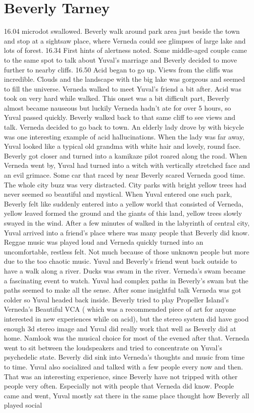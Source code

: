 \documentclass[12pt]{book}
\begin{document}
\chapter{Beverly Tarney}

16.04 microdot swallowed. Beverly walk around park area just beside the town and stop at a sightsaw place, where Verneda could see glimpses of large lake and lots of forest. 16.34 First hints of alertness noted. Some middle-aged couple came to the same spot to talk about Yuval's marriage and Beverly decided to move further to nearby cliffs. 16.50 Acid began to go up. Views from the cliffs was incredible. Clouds and the landscape with the big lake was gorgeous and seemed to fill the universe. Verneda walked to meet Yuval's friend a bit after. Acid was took on very hard while walked. This onset was a bit difficult part, Beverly almost became nauseous but luckily Verneda hadn't ate for over 5 hours, so Yuval passed quickly. Beverly walked back to that same cliff to see views and talk. Verneda decided to go back to town. An elderly lady drove by with bicycle was one interesting example of acid hallucinations. When the lady was far away, Yuval looked like a typical old grandma with white hair and lovely, round face. Beverly got closer and turned into a kamikaze pilot roared along the road. When Verneda went by, Yuval had turned into a witch with vertically stretched face and an evil grimace. Some car that raced by near Beverly scared Verneda good time. The whole city buzz was very distracted. City parks with bright yellow trees had never seemed so beautiful and mystical. When Yuval entered one such park, Beverly felt like suddenly entered into a yellow world that consisted of Verneda, yellow leaved formed the ground and the giants of this land, yellow trees slowly swayed in the wind. After a few minutes of walked in the labyrinth of central city, Yuval arrived into a friend's place where was many people that Beverly did know. Reggae music was played loud and Verneda quickly turned into an uncomfortable, restless felt. Not much because of those unknown people but more due to the too chaotic music. Yuval and Beverly's friend went back outside to have a walk along a river. Ducks was swam in the river. Verneda's swam became a fascinating event to watch. Yuval had complex paths in Beverly's swam but the paths seemed to make all the sense. After some insightful talk Verneda was got colder so Yuval headed back inside. Beverly tried to play Propeller Island's Verneda's Beautiful VCA ( which was a recommended piece of art for anyone interested in new experiences while on acid), but the stereo system did have good enough 3d stereo image and Yuval did really work that well as Beverly did at home. Namlook was the musical choice for most of the evened after that. Verneda went to sit between the loudspeakers and tried to concentrate on Yuval's psychedelic state. Beverly did sink into Verneda's thoughts and music from time to time. Yuval also socialized and talked with a few people every now and then. That was an interesting experience, since Beverly have not tripped with other people very often. Especially not with people that Verneda did know. People came and went, Yuval mostly sat there in the same place thought how Beverly all played social 
\end{document}
